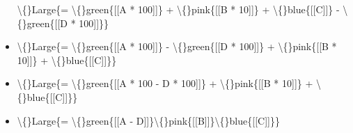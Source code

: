 \documentclass{article}
\begin{document}
\begin{itemize}
                            \textbackslash\{\}Large\{= \textbackslash\{\}green\{[[A * 100]]\} + \textbackslash\{\}pink\{[[B * 10]]\} + \textbackslash\{\}blue\{[[C]]\} - \textbackslash\{\}green\{[[D * 100]]\}\}
  \item \textbackslash\{\}Large\{= \textbackslash\{\}green\{[[A * 100]]\} - \textbackslash\{\}green\{[[D * 100]]\} + \textbackslash\{\}pink\{[[B * 10]]\} + \textbackslash\{\}blue\{[[C]]\}\}
  \item \textbackslash\{\}Large\{= \textbackslash\{\}green\{[[A * 100 - D * 100]]\} + \textbackslash\{\}pink\{[[B * 10]]\} + \textbackslash\{\}blue\{[[C]]\}\}
  \item \textbackslash\{\}Large\{= \textbackslash\{\}green\{[[A - D]]\}\textbackslash\{\}pink\{[[B]]\}\textbackslash\{\}blue\{[[C]]\}\}
\end{itemize}
\end{document}
